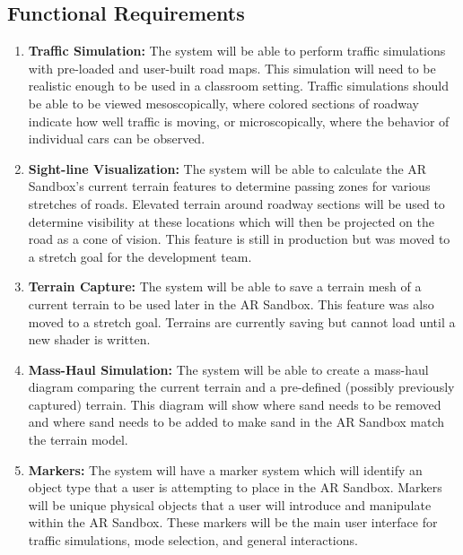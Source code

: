 \documentclass[letterpaper, 10pt, onecolumn, draftclsnofoot]{IEEEtran}
\begin{document}
    \subsection{\textbf{Functional Requirements}}
    \begin{enumerate}[\label={}]
    
        \item{\textbf{Traffic Simulation:} The system will be able to perform traffic simulations with pre-loaded and user-built road maps. This simulation will need to be realistic enough to be used in a classroom setting. Traffic simulations should be able to be viewed mesoscopically, where colored sections of roadway indicate how well traffic is moving, or microscopically, where the behavior of individual cars can be observed.}
        
        \item{\textbf{Sight-line Visualization:} The system will be able to calculate the AR Sandbox's current terrain features to determine passing zones for various stretches of roads. Elevated terrain around roadway sections will be used to determine visibility at these locations which will then be projected on the road as a cone of vision. This feature is still in production but was moved to a stretch goal for the development team.}
        
        \item{\textbf{Terrain Capture:} The system will be able to save a terrain mesh of a current terrain to be used later in the AR Sandbox. This feature was also moved to a stretch goal. Terrains are currently saving but cannot load until a new shader is written.}
        
        \item{\textbf{Mass-Haul Simulation:} The system will be able to create a mass-haul diagram comparing the current terrain and a pre-defined (possibly previously captured) terrain. This diagram will show where sand needs to be removed and where sand needs to be added to make sand in the AR Sandbox match the terrain model.}
        
        \item{\textbf{Markers:} The system will have a marker system which will identify an object type that a user is attempting to place in the AR Sandbox. Markers will be unique physical objects that a user will introduce and manipulate within the AR Sandbox. These markers will be the main user interface for traffic simulations, mode selection, and general interactions.}
        

\end{enumerate}
\end{document}
